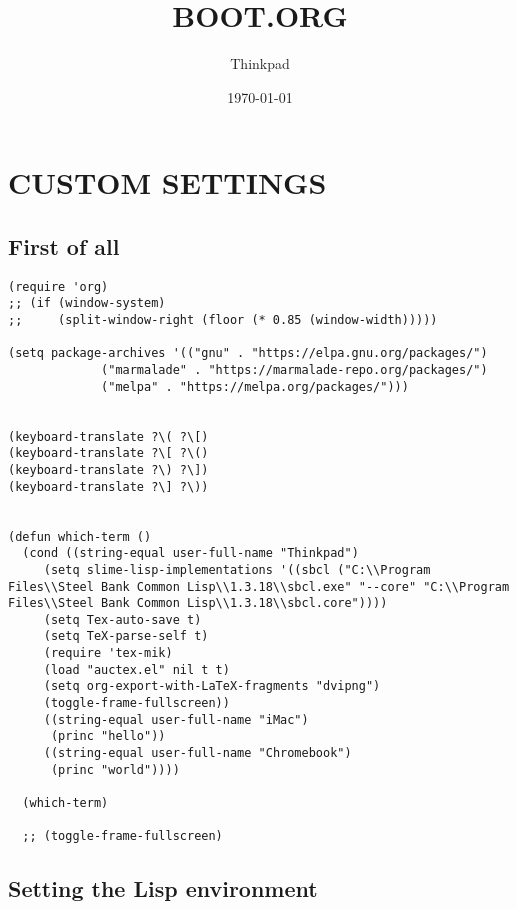 \documentclass[11pt]{article}
\author{Thinkpad}
\date{\today}
\title{BOOT.ORG}
\begin{document}
\maketitle
\tableofcontents





\section{CUSTOM SETTINGS}
\label{sec-1}


\subsection{First of all}
\label{sec-1-1}

\begin{verbatim}
(require 'org)
;; (if (window-system)
;;     (split-window-right (floor (* 0.85 (window-width)))))

(setq package-archives '(("gnu" . "https://elpa.gnu.org/packages/")
			 ("marmalade" . "https://marmalade-repo.org/packages/")
			 ("melpa" . "https://melpa.org/packages/")))


(keyboard-translate ?\( ?\[)
(keyboard-translate ?\[ ?\()
(keyboard-translate ?\) ?\])
(keyboard-translate ?\] ?\))


(defun which-term ()
  (cond ((string-equal user-full-name "Thinkpad")
	 (setq slime-lisp-implementations '((sbcl ("C:\\Program Files\\Steel Bank Common Lisp\\1.3.18\\sbcl.exe" "--core" "C:\\Program Files\\Steel Bank Common Lisp\\1.3.18\\sbcl.core"))))
	 (setq Tex-auto-save t)
	 (setq TeX-parse-self t)
	 (require 'tex-mik)
	 (load "auctex.el" nil t t)
	 (setq org-export-with-LaTeX-fragments "dvipng")
	 (toggle-frame-fullscreen))
	 ((string-equal user-full-name "iMac")
	  (princ "hello"))
	 ((string-equal user-full-name "Chromebook")
	  (princ "world"))))

  (which-term)

  ;; (toggle-frame-fullscreen)
\end{verbatim}


\subsection{Setting the Lisp environment}
\label{sec-1-2}
\end{document}
